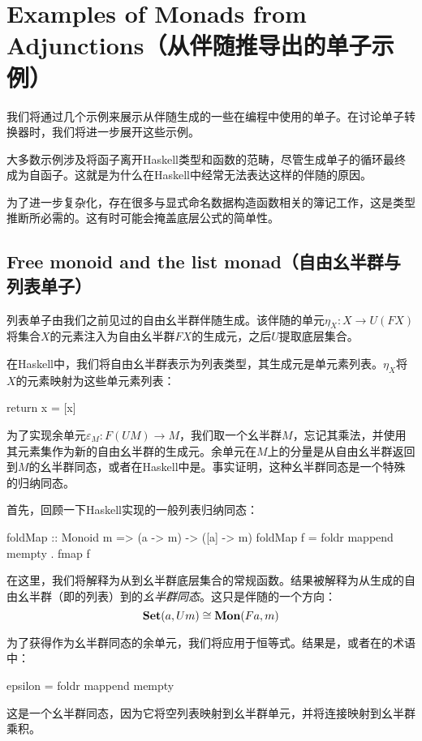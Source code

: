 \documentclass[DaoFP]{subfiles}
\begin{document}
    \section{Examples of Monads from Adjunctions（从伴随推导出的单子示例）}

    我们将通过几个示例来展示从伴随生成的一些在编程中使用的单子。在讨论单子转换器时，我们将进一步展开这些示例。

    大多数示例涉及将函子离开Haskell类型和函数的范畴，尽管生成单子的循环最终成为自函子。这就是为什么在Haskell中经常无法表达这样的伴随的原因。

    为了进一步复杂化，存在很多与显式命名数据构造函数相关的簿记工作，这是类型推断所必需的。这有时可能会掩盖底层公式的简单性。

    \subsection{Free monoid and the list monad（自由幺半群与列表单子）}
    列表单子由我们之前见过的自由幺半群伴随生成。该伴随的单元$\eta_X \colon X \to U (F X)$将集合$X$的元素注入为自由幺半群$F X$的生成元，之后$U$提取底层集合。

    在Haskell中，我们将自由幺半群表示为列表类型，其生成元是单元素列表。$\eta_X$将$X$的元素映射为这些单元素列表：
    \begin{haskell}
        return x = [x]
    \end{haskell}
    为了实现余单元$\varepsilon_M \colon F (U M) \to M$，我们取一个幺半群$M$，忘记其乘法，并使用其元素集作为新的自由幺半群的生成元。余单元在$M$上的分量是从自由幺半群返回到$M$的幺半群同态，或者在Haskell中是。事实证明，这种幺半群同态是一个特殊的归纳同态。

    首先，回顾一下Haskell实现的一般列表归纳同态：
    \begin{haskell}
        foldMap :: Monoid m => (a -> m) -> ([a] -> m)
        foldMap f = foldr mappend mempty . fmap f
    \end{haskell}
    在这里，我们将解释为从到幺半群底层集合的常规函数。结果被解释为从生成的自由幺半群（即的列表）到的\emph{幺半群同态}。这只是伴随的一个方向：
    \[ \mathbf{Set} (a, U m) \cong \mathbf{Mon} (F a, m) \]

    为了获得作为幺半群同态的余单元，我们将应用于恒等式。结果是，或者在的术语中：
    \begin{haskell}
        epsilon = foldr mappend mempty
    \end{haskell}
    这是一个幺半群同态，因为它将空列表映射到幺半群单元，并将连接映射到幺半群乘积。
\end{document}
